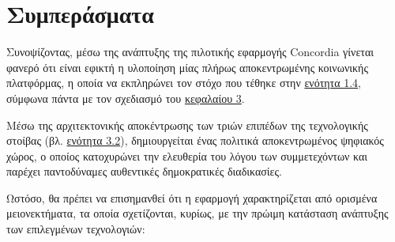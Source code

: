 \section{Συμπεράσματα}\label{section:5-1-conclusions}

Συνοψίζοντας, μέσω της ανάπτυξης της πιλοτικής εφαρμογής Concordia γίνεται φανερό ότι είναι εφικτή η υλοποίηση μίας πλήρως αποκεντρωμένης κοινωνικής πλατφόρμας, η οποία να εκπληρώνει τον στόχο που τέθηκε στην \hyperref[section:1-4-thesis-goal]{ενότητα 1.4}, σύμφωνα πάντα με τον σχεδιασμό του \hyperref[chapter:3-application-design]{κεφαλαίου 3}.

Μέσω της αρχιτεκτονικής αποκέντρωσης των τριών επιπέδων της τεχνολογικής στοίβας (βλ. \hyperref[section:3-2-technology-stack]{ενότητα 3.2}), δημιουργείται ένας πολιτικά αποκεντρωμένος ψηφιακός χώρος, ο οποίος κατοχυρώνει την ελευθερία του λόγου των συμμετεχόντων και παρέχει παντοδύναμες αυθεντικές δημοκρατικές διαδικασίες.

Ωστόσο, θα πρέπει να επισημανθεί ότι η εφαρμογή χαρακτηρίζεται από ορισμένα μειονεκτήματα, τα οποία σχετίζονται, κυρίως, με την πρώιμη κατάσταση ανάπτυξης των επιλεγμένων τεχνολογιών:


